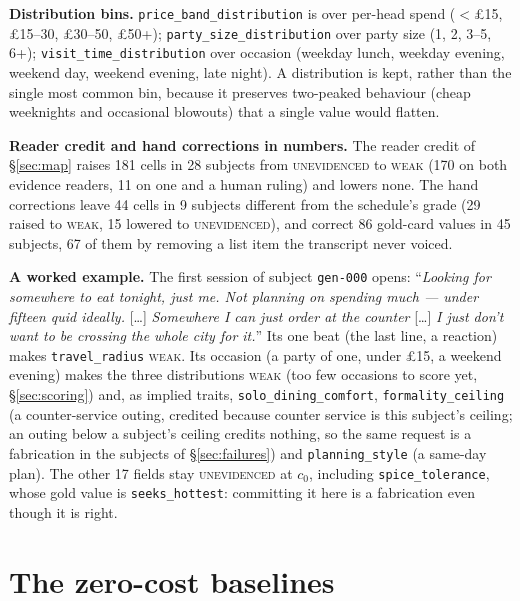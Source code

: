 \documentclass{article}
\begin{document}
\textbf{Distribution bins.} \texttt{price\_band\_distribution} is over per-head spend
($<$\pounds15, \pounds15--30, \pounds30--50, \pounds50+); \texttt{party\_size\_distribution} over
party size (1, 2, 3--5, 6+); \texttt{visit\_time\_distribution} over occasion (weekday lunch,
weekday evening, weekend day, weekend evening, late night). A distribution is kept, rather than
the single most common bin, because it preserves two-peaked behaviour (cheap weeknights and
occasional blowouts) that a single value would flatten.

\textbf{Reader credit and hand corrections in numbers.} The reader credit of \S\ref{sec:map}
raises 181 cells in 28 subjects from \textsc{unevidenced} to \textsc{weak} (170 on both evidence
readers, 11 on one and a human ruling) and lowers none. The hand corrections leave 44 cells in 9
subjects different from the schedule's grade (29 raised to \textsc{weak}, 15 lowered to
\textsc{unevidenced}), and correct 86 gold-card values in 45 subjects, 67 of them by removing a
list item the transcript never voiced.

\label{app:example}
\textbf{A worked example.} The first session of subject \texttt{gen-000} opens: ``\emph{Looking
for somewhere to eat tonight, just me. Not planning on spending much --- under fifteen quid
ideally.} [\dots] \emph{Somewhere I can just order at the counter} [\dots] \emph{I just don't want
to be crossing the whole city for it.}'' Its one beat (the last line, a reaction) makes
\texttt{travel\_radius} \textsc{weak}. Its occasion (a party of one, under \pounds15, a weekend
evening) makes the three distributions \textsc{weak} (too few occasions to score yet,
\S\ref{sec:scoring}) and, as implied traits, \texttt{solo\_dining\_comfort},
\texttt{formality\_ceiling} (a counter-service outing, credited because counter service is this
subject's ceiling; an outing below a subject's ceiling credits nothing, so the same request is a
fabrication in the subjects of \S\ref{sec:failures}) and \texttt{planning\_style} (a same-day
plan). The other 17 fields stay \textsc{unevidenced} at $c_0$, including \texttt{spice\_tolerance},
whose gold value is \texttt{seeks\_hottest}: committing it here is a fabrication even though it is
right.

\section{The zero-cost baselines}
\label{app:gate}
\end{document}
